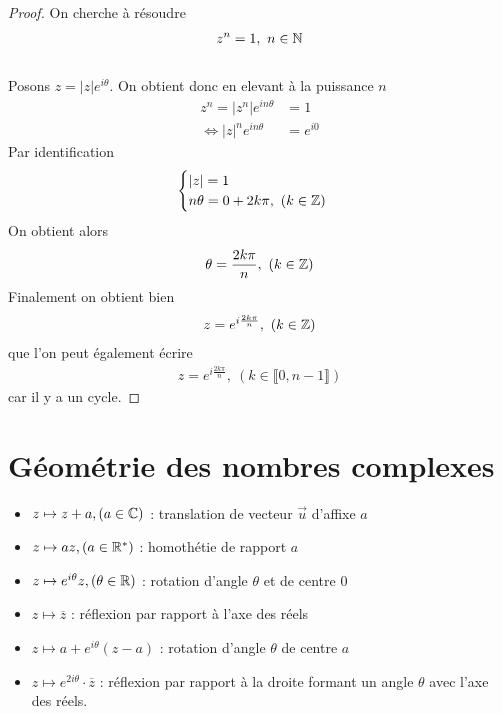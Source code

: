 \begin{proof}
On cherche à résoudre 
\begin{align*}
z^n = 1,\ n \in \mathbb{N}
\end{align*}
\\
Posons $z = |z|e^{i \theta}$. On obtient donc en elevant à la puissance $n$
\begin{align*}
z^n = |z^n|e^{i n \theta} &= 1 \\
\iff |z|^ne^{i n \theta} &= e^{i 0} 
\end{align*}
Par identification 
\begin{align*}
\begin{cases}
|z| = 1 \\
n \theta = 0 + 2 k \pi,\ (k \in \mathbb{Z})
\end{cases}
\end{align*}
On obtient alors 
\begin{align*}
\theta = \frac{2k \pi}{n},\ (k \in \mathbb{Z})
\end{align*}
Finalement on obtient bien 
\begin{align*}
z = e^{i \frac{2 k \pi}{n}},\ (k \in \mathbb{Z})
\end{align*}
que l'on peut également écrire 
\begin{align*}
z = e^{i \frac{2 k \pi}{n}},\ (k \in \llbracket 0, n - 1 \rrbracket )
\end{align*}
car il y a un cycle.
\end{proof}

\section{Géométrie des nombres complexes}
\begin{itemize}
    \item $z \mapsto z + a, (a \in \mathbb{C})$ : translation de vecteur $\vec{u}$ d'affixe $a$
    \item $z \mapsto az, (a \in \mathbb{R}^*)$ : homothétie de rapport $a$
    \item $z \mapsto e^{i\theta}z, (\theta \in \mathbb{R})$ : rotation d'angle $\theta$ et de centre $0$
    \item $z \mapsto \overline{z}$ : réflexion par rapport à l'axe des réels
    \item $z \mapsto a + e^{i\theta} (z - a)$ : rotation d'angle $\theta$ de centre $a$
    \item $z \mapsto e^{2i\theta} \cdot \overline{z}$ : réflexion par rapport à la droite formant un angle $\theta$ avec l'axe des réels.
\end{itemize}


